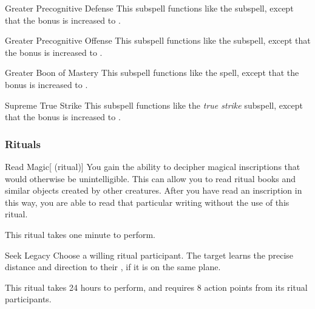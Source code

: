 \begin{ability}[\nth{4}]{Greater Precognitive Defense}
This subspell functions like the  subspell, except that the bonus is increased to .
\end{ability}
\vspace{0.25em}



\begin{ability}[\nth{4}]{Greater Precognitive Offense}
This subspell functions like the  subspell, except that the bonus is increased to .
\end{ability}
\vspace{0.25em}



\begin{ability}[\nth{5}]{Greater Boon of Mastery}
This subspell functions like the  spell, except that the bonus is increased to .
\end{ability}
\vspace{0.25em}



\begin{ability}[\nth{5}]{Supreme True Strike}
This subspell functions like the \textit{true strike} subspell, except that the bonus is increased to .
\end{ability}
\vspace{0.25em}



\subsubsection{Rituals}


\begin{ability}[\nth{1}]{Read Magic}[ (ritual)]
You gain the ability to decipher magical inscriptions that would otherwise be unintelligible.
This can allow you to read ritual books and similar objects created by other creatures.
After you have read an inscription in this way, you are able to read that particular writing without the use of this ritual.

This ritual takes one minute to perform.
\end{ability}
\vspace{0.25em}



\begin{ability}[\nth{2}]{Seek Legacy}
Choose a willing ritual participant.
The target learns the precise distance and direction to their , if it is on the same plane.

This ritual takes 24 hours to perform, and requires 8 action points from its ritual participants.
\end{ability}
\vspace{0.25em}



